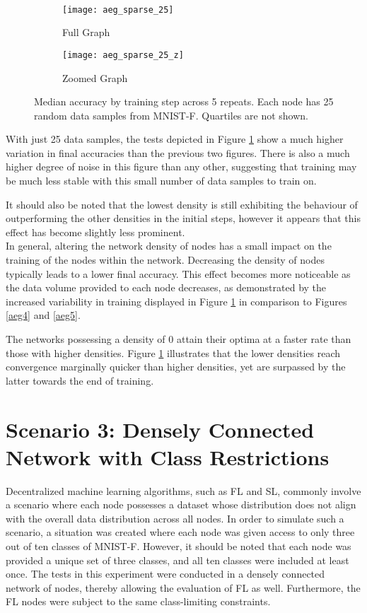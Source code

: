 \begin{figure}[H] 
	 \\
	\begin{subfigure}{0.49\textwidth}
		\texttt{[image: aeg\_sparse\_25]}
		\caption{Full Graph}
	\end{subfigure}
	\begin{subfigure}{0.49\textwidth}
		\texttt{[image: aeg\_sparse\_25\_z]}
		\caption{Zoomed Graph}
	\end{subfigure}
	\caption{Median accuracy by training step across 5 repeats. Each node has 25 random data samples from MNIST-F. Quartiles are not shown.}
	\label{aeg6}
\end{figure}

With just 25 data samples, the tests depicted in Figure \ref{aeg6} show a much higher variation in final accuracies than the previous two figures. There is also a much higher degree of noise in this figure than any other, suggesting that training may be much less stable with this small number of data samples to train on.

It should also be noted that the lowest density is still exhibiting the behaviour of outperforming the other densities in the initial steps, however it appears that this effect has become slightly less prominent. \\


In general, altering the network density of nodes has a small impact on the training of the nodes within the network. Decreasing the density of nodes typically leads to a lower final accuracy. This effect becomes more noticeable as the data volume provided to each node decreases, as demonstrated by the increased variability in training displayed in Figure \ref{aeg6} in comparison to Figures \ref{aeg4} and \ref{aeg5}.

The networks possessing a density of 0 attain their optima at a faster rate than those with higher densities. Figure \ref{aeg6} illustrates that the lower densities reach convergence marginally quicker than higher densities, yet are surpassed by the latter towards the end of training.

\section{Scenario 3: Densely Connected Network with Class Restrictions}

Decentralized machine learning algorithms, such as FL and SL, commonly involve a scenario where each node possesses a dataset whose distribution does not align with the overall data distribution across all nodes. In order to simulate such a scenario, a situation was created where each node was given access to only three out of ten classes of MNIST-F. However, it should be noted that each node was provided a unique set of three classes, and all ten classes were included at least once. The tests in this experiment were conducted in a densely connected network of nodes, thereby allowing the evaluation of FL as well. Furthermore, the FL nodes were subject to the same class-limiting constraints. 

